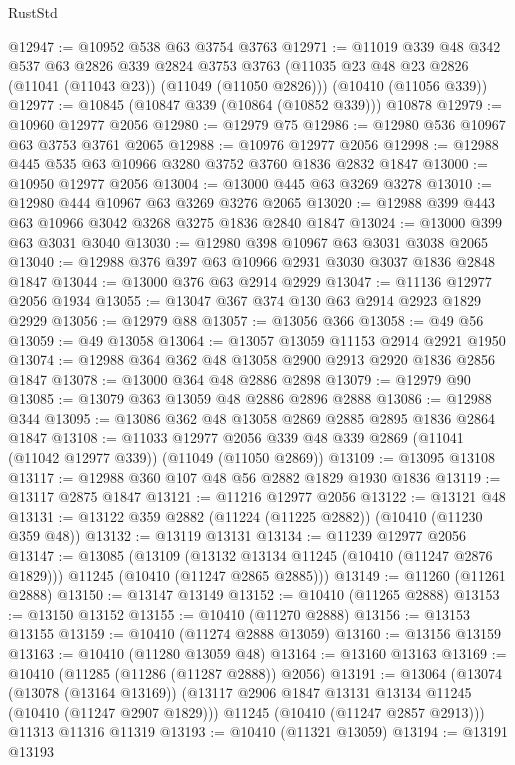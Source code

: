 \begin{lexlean}{RustStd}
\begin{coremodule}
@12947 := @10952 @538 @63 @3754 @3763
@12971 := @11019
    @339
    @48
    @342
    @537
    @63
    @2826
    @339
    @2824
    @3753
    @3763
    (@11035 @23 @48 @23 @2826 (@11041 (@11043 @23)) (@11049 (@11050 @2826)))
    (@10410 (@11056 @339))
@12977 := @10845 (@10847 @339 (@10864 (@10852 @339))) @10878
@12979 := @10960 @12977 @2056
@12980 := @12979 @75
@12986 := @12980 @536 @10967 @63 @3753 @3761 @2065
@12988 := @10976 @12977 @2056
@12998 := @12988 @445 @535 @63 @10966 @3280 @3752 @3760 @1836 @2832 @1847
@13000 := @10950 @12977 @2056
@13004 := @13000 @445 @63 @3269 @3278
@13010 := @12980 @444 @10967 @63 @3269 @3276 @2065
@13020 := @12988 @399 @443 @63 @10966 @3042 @3268 @3275 @1836 @2840 @1847
@13024 := @13000 @399 @63 @3031 @3040
@13030 := @12980 @398 @10967 @63 @3031 @3038 @2065
@13040 := @12988 @376 @397 @63 @10966 @2931 @3030 @3037 @1836 @2848 @1847
@13044 := @13000 @376 @63 @2914 @2929
@13047 := @11136 @12977 @2056 @1934
@13055 := @13047 @367 @374 @130 @63 @2914 @2923 @1829 @2929
@13056 := @12979 @88
@13057 := @13056 @366
@13058 := @49 @56
@13059 := @49 @13058
@13064 := @13057 @13059 @11153 @2914 @2921 @1950
@13074 := @12988 @364 @362 @48 @13058 @2900 @2913 @2920 @1836 @2856 @1847
@13078 := @13000 @364 @48 @2886 @2898
@13079 := @12979 @90
@13085 := @13079 @363 @13059 @48 @2886 @2896 @2888
@13086 := @12988 @344
@13095 := @13086 @362 @48 @13058 @2869 @2885 @2895 @1836 @2864 @1847
@13108 := @11033
    @12977
    @2056
    @339
    @48
    @339
    @2869
    (@11041 (@11042 @12977 @339))
    (@11049 (@11050 @2869))
@13109 := @13095 @13108
@13117 := @12988 @360 @107 @48 @56 @2882 @1829 @1930 @1836
@13119 := @13117 @2875 @1847
@13121 := @11216 @12977 @2056
@13122 := @13121 @48
@13131 := @13122 @359 @2882 (@11224 (@11225 @2882)) (@10410 (@11230 @359 @48))
@13132 := @13119 @13131
@13134 := @11239 @12977 @2056
@13147 := @13085
    (@13109
      (@13132 @13134 @11245 (@10410 (@11247 @2876 @1829)))
      @11245
      (@10410 (@11247 @2865 @2885)))
@13149 := @11260 (@11261 @2888)
@13150 := @13147 @13149
@13152 := @10410 (@11265 @2888)
@13153 := @13150 @13152
@13155 := @10410 (@11270 @2888)
@13156 := @13153 @13155
@13159 := @10410 (@11274 @2888 @13059)
@13160 := @13156 @13159
@13163 := @10410 (@11280 @13059 @48)
@13164 := @13160 @13163
@13169 := @10410 (@11285 (@11286 (@11287 @2888)) @2056)
@13191 := @13064
    (@13074
      (@13078 (@13164 @13169))
      (@13117 @2906 @1847 @13131 @13134 @11245 (@10410 (@11247 @2907 @1829)))
      @11245
      (@10410 (@11247 @2857 @2913)))
    @11313
    @11316
    @11319
@13193 := @10410 (@11321 @13059)
@13194 := @13191 @13193

\end{coremodule}
\end{lexlean}
